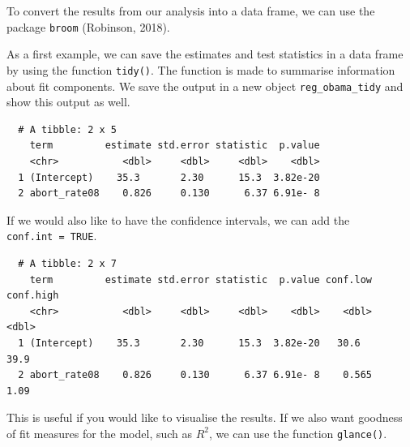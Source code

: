 \documentclass[12pt,oneside]{reedthesis}
\theoremstyle{definition}
\theoremstyle{definition}
\theoremstyle{definition}
\theoremstyle{remark}
\begin{document}
  To convert the results from our analysis into a data frame, we can use
  the package \texttt{broom} (Robinson, 2018).
  \begin{Shaded}
  \begin{Highlighting}[]
  \NormalTok{(}\NormalTok{)}
  \end{Highlighting}
  \end{Shaded}
  As a first example, we can save the estimates and test statistics in a
  data frame by using the function \texttt{tidy()}. The function is made
  to summarise information about fit components. We save the output in a
  new object \texttt{reg\_obama\_tidy} and show this output as well.
  \begin{Shaded}
  \begin{Highlighting}[]
  \StringTok{ }
  
  \end{Highlighting}
  \end{Shaded}
  \begin{verbatim}
  # A tibble: 2 x 5
    term         estimate std.error statistic  p.value
    <chr>           <dbl>     <dbl>     <dbl>    <dbl>
  1 (Intercept)    35.3       2.30      15.3  3.82e-20
  2 abort_rate08    0.826     0.130      6.37 6.91e- 8
  \end{verbatim}
  If we would also like to have the confidence intervals, we can add the
  \texttt{conf.int\ =\ TRUE}.
  \begin{Shaded}
  \begin{Highlighting}[]
  \StringTok{ } \NormalTok{)}
  
  \end{Highlighting}
  \end{Shaded}
  \begin{verbatim}
  # A tibble: 2 x 7
    term         estimate std.error statistic  p.value conf.low conf.high
    <chr>           <dbl>     <dbl>     <dbl>    <dbl>    <dbl>     <dbl>
  1 (Intercept)    35.3       2.30      15.3  3.82e-20   30.6       39.9 
  2 abort_rate08    0.826     0.130      6.37 6.91e- 8    0.565      1.09
  \end{verbatim}
  This is useful if you would like to visualise the results. If we also
  want goodness of fit measures for the model, such as \(R^2\), we can use
  the function \texttt{glance()}.
\end{document}
